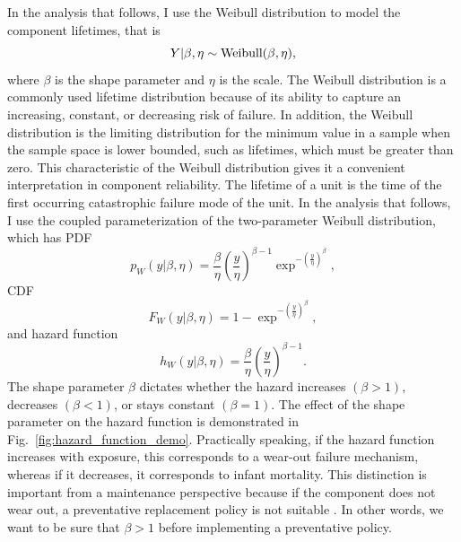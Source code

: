In the analysis that follows, I use the Weibull distribution to model the component lifetimes, that is
\begin{equation}
    Y|\beta, \eta \sim \hbox{Weibull}(\beta, \eta),
\end{equation}
where $\beta$ is the shape parameter and $\eta$ is the scale. The Weibull distribution is a commonly used lifetime distribution because of its ability to capture an increasing, constant, or decreasing risk of failure. In addition, the Weibull distribution is the limiting distribution for the minimum value in a sample when the sample space is lower bounded, such as lifetimes, which must be greater than zero. This characteristic of the Weibull distribution gives it a convenient interpretation in component reliability. The lifetime of a unit is the time of the first occurring catastrophic failure mode of the unit. In the analysis that follows, I use the coupled parameterization of the two-parameter Weibull distribution, which has PDF
\begin{equation}
    \label{eq:weibull-pdf}
    p_{W}(y|\beta, \eta) = \frac{\beta}{\eta}\left(\frac{y}{\eta}\right)^{\beta - 1} \exp^{-\left(\frac{y}{\eta}\right)^{\beta}},
\end{equation}
CDF
\begin{equation}
    \label{eq:weibull-cdf}
    F_{W}(y|\beta, \eta) = 1 - \exp^{-\left(\frac{y}{\eta}\right)^{\beta}},
\end{equation}
and hazard function
\begin{equation}
    h_{W}(y|\beta, \eta) = \frac{\beta}{\eta}\left(\frac{y}{\eta}\right)^{\beta - 1}.
\end{equation}
The shape parameter $\beta$ dictates whether the hazard increases $(\beta > 1)$, decreases $(\beta < 1)$, or stays constant $(\beta = 1)$. The effect of the shape parameter on the hazard function is demonstrated in Fig.~\ref{fig:hazard_function_demo}. Practically speaking, if the hazard function increases with exposure, this corresponds to a wear-out failure mechanism, whereas if it decreases, it corresponds to infant mortality. This distinction is important from a maintenance perspective because if the component does not wear out, a preventative replacement policy is not suitable \citep{jardine2013}. In other words, we want to be sure that $\beta > 1$ before implementing a preventative policy.

